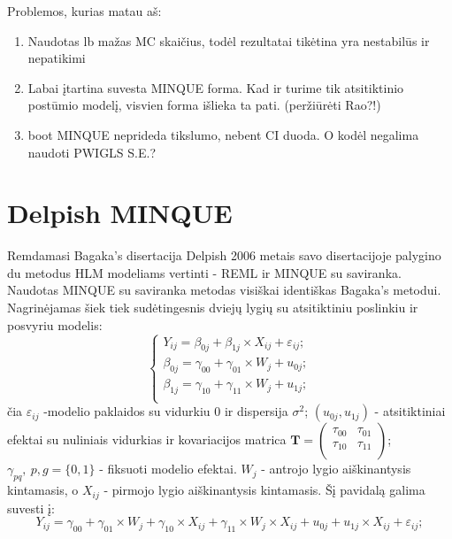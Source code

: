 \documentclass[12pt,a4paper]{article}
\begin{document}
Problemos, kurias matau aš:
\begin{enumerate}
\item Naudotas lb mažas MC skaičius, todėl rezultatai tikėtina yra nestabilūs ir nepatikimi
\item Labai įtartina suvesta MINQUE forma. Kad ir turime tik atsitiktinio postūmio modelį, visvien forma išlieka ta pati. (peržiūrėti Rao?!)
\item boot MINQUE neprideda tikslumo, nebent CI duoda. O kodėl negalima naudoti PWIGLS S.E.?
\end{enumerate}


\section{Delpish MINQUE}
\indent Remdamasi Bagaka's disertacija Delpish 2006 metais savo disertacijoje \cite{delpish} palygino du metodus HLM modeliams vertinti - REML ir MINQUE su saviranka. Naudotas MINQUE su saviranka metodas visiškai identiškas Bagaka's metodui. Nagrinėjamas šiek tiek sudėtingesnis dviejų lygių su atsitiktiniu poslinkiu ir posvyriu modelis:
\begin{equation} \label{eq:2lvldelpish}
\left\{
\begin{array}{l}
Y_{ij} = \beta_{0j}+ \beta_{1j}\times X_{ij}+\varepsilon_{ij}; \\
\beta_{0j} = \gamma_{00} +\gamma_{01}\times W_{j}+u_{0j};\\
\beta_{1j} = \gamma_{10} +\gamma_{11}\times W_{j}+u_{1j};\\
\end{array} \right.
\end{equation}
čia $\varepsilon_{ij}$ -modelio paklaidos su vidurkiu $0$ ir dispersija $\sigma^2$; $\left(u_{0j}, u_{1j}\right)$ - atsitiktiniai efektai su nuliniais vidurkias ir kovariacijos matrica $\mathbf{T}=\begin{pmatrix}
\tau_{00} & \tau_{01} \\
\tau_{10} & \tau_{11} \\
\end{pmatrix}$; $\gamma_{pq},\ p,g = \{0,1\}$ - fiksuoti modelio efektai. $W_j$ - antrojo lygio aiškinantysis kintamasis, o $X_{ij}$ - pirmojo lygio aiškinantysis kintamasis. Šį pavidalą galima suvesti į:
\begin{equation} \label{eq:deq}
Y_{ij} = \gamma_{00} +\gamma_{01}\times W_{j}+ \gamma_{10}\times X_{ij}+\gamma_{11}\times W_{j}\times X_{ij}+u_{0j}+u_{1j}\times X_{ij}+\varepsilon_{ij};
\end{equation}
\end{document}

